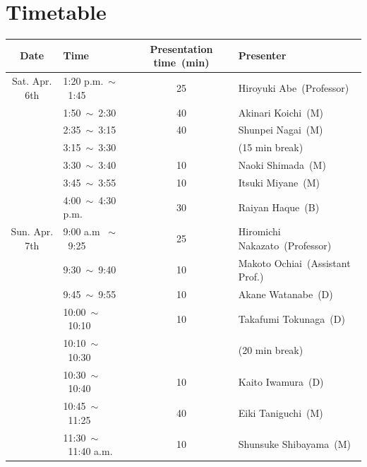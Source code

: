 \documentclass[unicode,a4paper,11pt]{ltjsarticle}
\begin{document}
\section{Timetable}

\begin{center}
  \begin{tabular}{clcl}\hline
    Date          & Time                      & Presentation time\ (min) & Presenter                        \\ \hline
    Sat. Apr. 6th & 1:20 p.m.\ $\sim$\ 1:45   & 25                       & Hiroyuki Abe\ (Professor)        \\
                  & 1:50\ $\sim$\ 2:30        & 40                       & Akinari Koichi\ (M)              \\
                  & 2:35\ $\sim$\ 3:15        & 40                       & Shunpei Nagai\ (M)               \\
                  & 3:15\ $\sim$\ 3:30        &                          & (15 min break)                   \\
                  & 3:30\ $\sim$\ 3:40        & 10                       & Naoki Shimada\ (M)               \\
                  & 3:45\ $\sim$\ 3:55        & 10                       & Itsuki Miyane\ (M)               \\
                  & 4:00\ $\sim$\ 4:30 p.m.   & 30                       & Raiyan Haque\ (B)                \\ \hline
    Sun. Apr. 7th & 9:00 a.m \ $\sim$\ 9:25   & 25                       & Hiromichi Nakazato\ (Professor)  \\
                  & 9:30\ $\sim$\ 9:40        & 10                       & Makoto Ochiai\ (Assistant Prof.) \\
                  & 9:45\ $\sim$\ 9:55        & 10                       & Akane Watanabe\ (D)              \\
                  & 10:00\ $\sim$\ 10:10      & 10                       & Takafumi Tokunaga\ (D)           \\
                  & 10:10\ $\sim$\ 10:30      &                          & (20 min break)                   \\
                  & 10:30\ $\sim$\ 10:40      & 10                       & Kaito Iwamura\ (D)               \\
                  & 10:45\ $\sim$\ 11:25      & 40                       & Eiki Taniguchi\ (M)              \\
                  & 11:30\ $\sim$\ 11:40 a.m. & 10                       & Shunsuke Shibayama\ (M)          \\ \hline
  \end{tabular}
\end{center}
\end{document}
